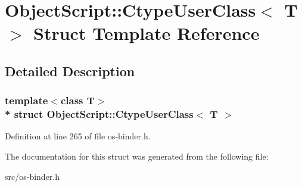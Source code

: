 \hypertarget{struct_object_script_1_1_ctype_user_class}{}\section{Object\+Script\+:\+:Ctype\+User\+Class$<$ T $>$ Struct Template Reference}
\label{struct_object_script_1_1_ctype_user_class}


\subsection{Detailed Description}
\subsubsection*{template$<$class T$>$\\*
struct Object\+Script\+::\+Ctype\+User\+Class$<$ T $>$}



Definition at line 265 of file os-\/binder.\+h.



The documentation for this struct was generated from the following file\+:\begin{DoxyCompactItemize}
\item 
src/os-\/binder.\+h\end{DoxyCompactItemize}
